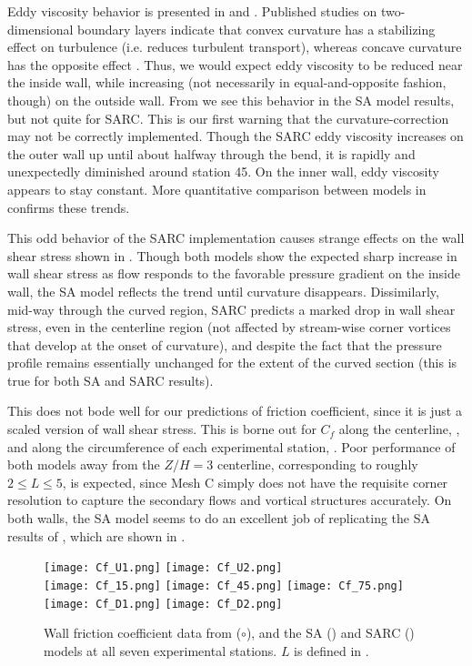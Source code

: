 \documentclass[11pt]{article}
\begin{document}
Eddy viscosity behavior is presented in  and . Published studies on two-dimensional boundary layers indicate that convex curvature has a stabilizing effect on turbulence (i.e. reduces turbulent transport), whereas concave curvature has the opposite effect \citep{kim1994}. Thus, we would expect eddy viscosity to be reduced near the inside wall, while increasing (not necessarily in equal-and-opposite fashion, though) on the outside wall. From  we see this behavior in the SA model results, but not quite for SARC. This is our first warning that the curvature-correction may not be correctly implemented. Though the SARC eddy viscosity increases on the outer wall up until about halfway through the bend, it is rapidly and unexpectedly diminished around station 45. On the inner wall, eddy viscosity appears to stay constant. More quantitative comparison between models in  confirms these trends.

This odd behavior of the SARC implementation causes strange effects on the wall shear stress shown in . Though both models show the expected sharp increase in wall shear stress as flow responds to the favorable pressure gradient on the inside wall, the SA model reflects the trend until curvature disappears. Dissimilarly, mid-way through the curved region, SARC predicts a marked drop in wall shear stress, even in the centerline region (not affected by stream-wise corner vortices that develop at the onset of curvature), and despite the fact that the pressure profile remains essentially unchanged for the extent of the curved section (this is true for both SA and SARC results).

This does not bode well for our predictions of friction coefficient, since it is just a scaled version of wall shear stress. This is borne out for $C_f$ along the centerline, , and along the circumference of each experimental station, . Poor performance of both models away from the $Z/H=3$ centerline, corresponding to roughly $2 \le L \le 5$, is expected, since Mesh C simply does not have the requisite corner resolution to capture the secondary flows and vortical structures accurately. On both walls, the SA model seems to do an excellent job of replicating the SA results of \citet{shur2000}, which are shown in .

\begin{figure}[p]
\centering
\texttt{[image: Cf\_U1.png]}
\texttt{[image: Cf\_U2.png]}\\
\texttt{[image: Cf\_15.png]}
\texttt{[image: Cf\_45.png]}
\texttt{[image: Cf\_75.png]}\\
\texttt{[image: Cf\_D1.png]}
\texttt{[image: Cf\_D2.png]}
\caption{Wall friction coefficient data from \citet{kim1994} ($\circ$), and the SA ({\color{blue}\solidrule[6mm]}) and SARC ({\color{red}\dashrule}) models at all seven experimental stations. $L$ is defined in .}
\label{fig:Cf_slices}
\end{figure}
\end{document}
